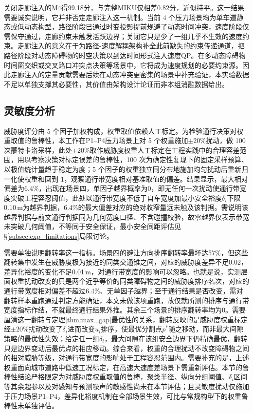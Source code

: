 \documentclass[a4paper,11pt]{ctexart}
\theoremstyle{definition}
\begin{document}
关闭走廊注入的M4得99.18分，与完整MIKU仅相差0.82分，近似持平。这一结果需要诚实说明，它并非否定走廊注入这一机制。当前 4 个压力场景均为单车道静态或低动态构型，路径阶段已通过时变投影提前规避了动态时间冲突，速度阶段仅需保守通过，走廊约束未触发活跃边界；关闭它只是少了一组几乎不生效的速度约束。走廊注入的意义在于为路径-速度解耦架构补全此前缺失的约束传递通道，把路径阶段对动态障碍物的时空决策以到达时间形式注入速度QP。在多动态障碍物时间窗交织或交叉路口冲突点决策等场景中，它将成为速度规划的必要约束源。因此走廊注入的定量贡献需要后续在动态冲突更密集的场景中补充验证，本实验数据不足以单独支撑其必要性，其价值由架构设计论证而非本组消融数据给出。

\subsection{灵敏度分析}
\label{subsec:exp_sensitivity}

威胁度评分由 5 个因子加权构成，权重取值依赖人工标定。为检验通行决策对权重取值的鲁棒性，本工作在P1--P4压力场景上对 5 个权重施加$\pm 20\%$扰动，做 100 次蒙特卡洛采样，此处$\pm 20\%$取作威胁度权重人工标定在工程实践中的合理容差范围，用以考察决策对标定误差的鲁棒性，100 次为确定性复现下的固定采样预算、以极值统计量趋于稳定为度；5 个因子的权重独立同分布地施加均匀扰动后重新归一化使权重和回到 1，观察通行带宽度相对基准取值的偏差。结果显示，最大相对偏差为6.4\%，出现在场景四，单因子越界概率为0，即无任何一次扰动使通行带宽度突破工程容忍阈值，此处以通行带宽度不低于自车宽度加最小安全裕度$\delta_i$下限$0.10$\,m为越界判据，6.4\%的最大偏差对应的绝对收窄量远未触及该判据。需说明该越界判据与前文通行判据同为几何宽度口径、不含碰撞校验，故零越界仅表示带宽未突破几何阈值，不等同于安全保证，最小安全间距评估见§\ref{subsec:exp_limitations}局限讨论。

需要单独说明翻转率这一指标。场景四的避让方向排序翻转率最坏达57\%，但这些翻转集中发生在威胁度极为接近的同类交通锥之间，对应的威胁度差异不足0.02，差异化裕度的变化不足0.01\,m，对通行带宽度的影响可以忽略。也就是说，实测层面权重扰动改变的只是两个近乎等价的同类障碍物之间的威胁度排序名次，对应的通行带宽度相对偏差不超过6.4\%、无单因子越界；至于通行结果是否改变，需对翻转样本重跑通过判定方能确证，本文未做该项重跑，故仅就所测的排序与通行带宽度指标作结，不就最终通行结果外推。其余三个场景的排序翻转率均为0。需要厘清这一翻转与定理\ref{thm:max_gap}最优性的关系，翻转反映的是威胁度权重标定经$\pm20\%$扰动改变了$\delta_i$进而改变$u_i$排序，使最优分割点$p^{*}$随之移动，而非最大间隙策略的最优性失效；给定任一组$\delta_i$，最大间隙在该组安全边界下仍精确最优，翻转只是边界变动后最优点的相应移动。综合来看，权重的合理扰动不改变障碍物之间的相对威胁等级，对通行带宽度的影响处于工程容忍范围内。需要补充的是，上述权重面向城市道路中低速工况标定，在高速大速度差场景下需重新评估。本节的鲁棒性结论严格限定为对威胁度权重取值的鲁棒，聚类半径、纵向分组阈值、$\delta_i$区间等其余超参以及对感知与预测噪声的敏感性尚未在本节评估；且灵敏度扰动仅施加于压力场景P1--P4，差异化裕度机制在全部场景生效，可比与常规构型下的权重鲁棒性未单独评估。
\end{document}
